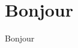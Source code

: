 \documentclass[letterpaper,12pt,oneside]{article}  %
\begin{document}
\maketitle
\section{Bonjour}

Bonjour
\end{document}
